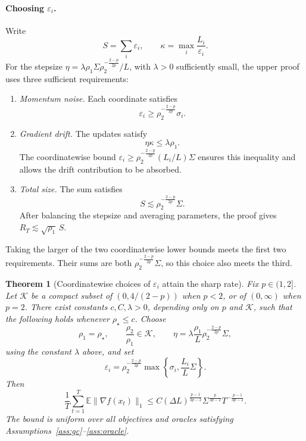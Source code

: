\documentclass[11pt,letterpaper]{article}
\newtheorem{theorem}{Theorem}[section]
\theoremstyle{definition}
\newcommand{\E}{\mathbb E}
\newcommand{\eps}{\varepsilon}
\newcommand{\grad}{\nabla}
\begin{document}
\paragraph{Choosing \texorpdfstring{$\eps_i$}{epsilon}.}
Write
\[
S=\sum_i\eps_i,\qquad
\kappa=\max_i\frac{L_i}{\eps_i}.
\]
For the stepsize
$\eta=\lambda\rho_1\Sigma\rho_2^{-\frac{2-p}{2p}}/L$,
with $\lambda>0$ sufficiently small, the upper proof uses three
sufficient requirements:
\begin{enumerate}
\item \emph{Momentum noise.} Each coordinate satisfies
\[
\eps_i\ge\rho_2^{-\frac{2-p}{2p}}\sigma_i.
\]
\item \emph{Gradient drift.} The updates satisfy
\[
\eta\kappa\le\lambda\rho_1.
\]
The coordinatewise bound
$\eps_i\ge\rho_2^{-\frac{2-p}{2p}}(L_i/L)\Sigma$
ensures this inequality and allows the drift contribution to be absorbed.
\item \emph{Total size.} The sum satisfies
\[
S\lesssim\rho_2^{-\frac{2-p}{2p}}\Sigma.
\]
After balancing the stepsize and averaging parameters, the proof gives
$R_T\lesssim\sqrt{\rho_1}\,S$.
\end{enumerate}
Taking the larger of the two coordinatewise lower bounds meets the first
two requirements. Their sums are both
$\rho_2^{-\frac{2-p}{2p}}\Sigma$, so this choice also meets the third.

\begin{theorem}[Coordinatewise choices of $\eps_i$ attain the sharp rate]
\label{thm:vector-upper}
Fix $p\in(1,2]$. Let $\mathcal K$ be a compact subset of
$(0,4/(2-p))$ when $p<2$, or of $(0,\infty)$ when $p=2$.
There exist constants $c,C,\lambda>0$, depending only on $p$ and
$\mathcal K$, such that the following holds whenever
$\rho_\star\le c$.
Choose
\[
\rho_1=\rho_\star,
\qquad
\frac{\rho_2}{\rho_1}\in\mathcal K,
\qquad
\eta=\lambda\frac{\rho_1}{L}\rho_2^{-\frac{2-p}{2p}}\Sigma,
\]
using the constant $\lambda$ above, and set
\begin{equation}
\eps_i=\rho_2^{-\frac{2-p}{2p}}
\max\left\{\sigma_i,\frac{L_i}{L}\Sigma\right\}.
\label{eq:coordinate-scales}
\end{equation}
Then
\begin{equation}
\frac1T\sum_{t=1}^T\E\|\grad f(x_t)\|_1
\le C
(\Delta L)^{\frac{p-1}{3p-2}}
\Sigma^{\frac{p}{3p-2}}T^{-\frac{p-1}{3p-2}}.
\label{eq:vector-rate}
\end{equation}
The bound is uniform over all objectives and oracles satisfying Assumptions~\ref{ass:gc}--\ref{ass:oracle}.
\end{theorem}
\end{document}
